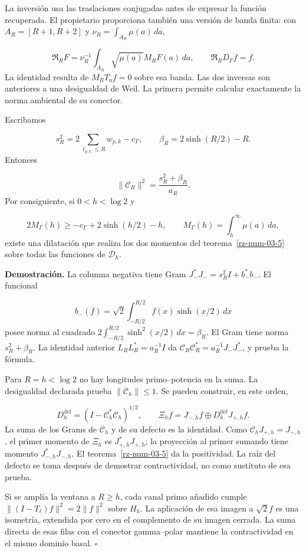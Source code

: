 La inversión usa las traslaciones conjugadas antes de expresar la función recuperada. El propietario proporciona también una versión de banda finita: con \(A_R=[R+1,R+2]\) y \(\nu_R=\int_{A_R}\mu(a)\,da\),

\[
\mathfrak R_RF=\nu_R^{-1}\int_{A_R}
\sqrt{\mu(a)}M_RF(a)\,da,\qquad
\mathfrak R_RD_\Gamma f=f.
\]
La identidad resulta de \(M_RT_af=0\) sobre esa banda. Las dos inversas son anteriores a una desigualdad de Weil. La primera permite calcular exactamente la norma ambiental de su conector.

Escribamos

\[
s_R^2=2\sum_{\ell_{p,k}\leq R}w_{p,k}-c_\Gamma,\qquad
\beta_R=2\sinh(R/2)-R.
\]
Entonces

\[
\|\mathcal C_R\|^2=\frac{s_R^2+\beta_R}{a_R}.
\]
Por consiguiente, si \(0<h<\log2\) y

\[
2M_\Gamma(h)\geq-c_\Gamma+2\sinh(h/2)-h,\qquad
M_\Gamma(h)=\int_h^\infty\mu(a)\,da,
\]
existe una dilatación que realiza los dos momentos del teorema~\ref{rz-num-03-5} sobre todas las funciones de \(\mathcal D_h\).

\textbf{Demostración.} La columna negativa tiene Gram \(J_-^*J_-=s_R^2I+b_-^*b_-\). El funcional

\[
b_-(f)=\sqrt2\int_{-R/2}^{R/2}f(x)\sinh(x/2)\,dx
\]
posee norma al cuadrado \(2\int_{-R/2}^{R/2}\sinh^2(x/2)\,dx=\beta_R\). El Gram tiene norma \(s_R^2+\beta_R\). La identidad anterior \(L_RL_R^*=a_R^{-1}I\) da \(\mathcal C_R\mathcal C_R^*=a_R^{-1}J_-J_-^*\), y prueba la fórmula.

Para \(R=h<\log2\) no hay longitudes primo–potencia en la suma. La desigualdad declarada prueba \(\|\mathcal C_h\|\leq1\). Se pueden construir, en este orden,

\[
D_h^{\mathrm{def}}=(I-\mathcal C_h^*\mathcal C_h)^{1/2},
\qquad
\Xi_hf=J_{-,h}f\oplus D_h^{\mathrm{def}}J_{+,h}f.
\]
La suma de los Grams de \(\mathcal C_h\) y de su defecto es la identidad. Como \(\mathcal C_hJ_{+,h}=J_{-,h}\), el primer momento de \(\Xi_h\) es \(J_{+,h}^*J_{+,h}\); la proyección al primer sumando tiene momento \(J_{-,h}^*J_{-,h}\). El teorema~\ref{rz-num-03-5} da la positividad. La raíz del defecto se toma después de demostrar contractividad, no como sustituto de esa prueba.

Si se amplía la ventana a \(R\geq h\), cada canal primo añadido cumple \(\|(I-T_\ell)f\|^2=2\|f\|^2\) sobre \(H_h\). La aplicación de esa imagen a \(\sqrt2f\) es una isometría, extendida por cero en el complemento de su imagen cerrada. La suma directa de esas filas con el conector gamma–polar mantiene la contractividad en el mismo dominio basal. \hfill\(\square\)

